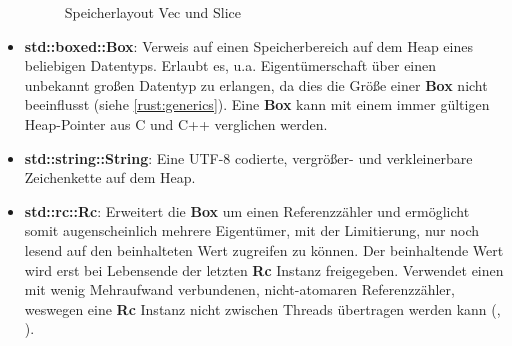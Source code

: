 \begin{itemize}
\begin{figure}[H]
		\caption{Speicherlayout Vec und Slice \cite[63]{rust:orly_programming}}
		\label{rust:memory_layout:vec_slice}
	\end{figure}
	
	\item \textbf{std::boxed::Box}:
	Verweis auf einen Speicherbereich auf dem Heap eines beliebigen Datentyps.
	Erlaubt es, u.a. Eigentümerschaft über einen unbekannt großen Datentyp zu erlangen, da dies die Größe einer \textbf{Box} nicht beeinflusst (siehe \autoref{rust:generics}).
	Eine \textbf{Box} kann mit einem immer gültigen Heap-Pointer aus C und C++ verglichen werden.
	
	\item \textbf{std::string::String}: Eine UTF-8 codierte, vergrößer- und verkleinerbare Zeichenkette auf dem Heap.
	
	\item \textbf{std::rc::Rc}: Erweitert die \textbf{Box} um einen Referenzzähler und ermöglicht somit augenscheinlich mehrere Eigentümer, mit der Limitierung, nur noch lesend auf den beinhalteten Wert zugreifen zu können.
	Der beinhaltende Wert wird erst bei Lebensende der letzten \textbf{Rc} Instanz freigegeben.
	Verwendet einen mit wenig Mehraufwand verbundenen, nicht-atomaren Referenzzähler, weswegen eine \textbf{Rc} Instanz nicht zwischen Threads übertragen werden kann (, ).
	

\end{itemize}
